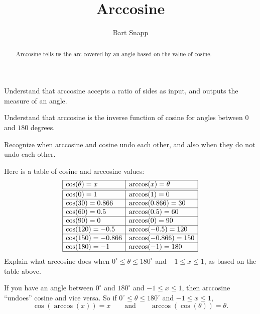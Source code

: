 \documentclass[noauthor,nooutcomes,handout,hints]{ximera}
\title{Arccosine} \author{Bart Snapp}
\begin{document}
\begin{abstract}
  Arccosine tells us the arc covered by an angle based on the value of
  cosine.
\end{abstract}
\maketitle

\begin{listOutcomes}
\item Understand that arccosine accepts a ratio of sides as input, and
  outputs the measure of an angle.
\item Understand that arccosine is the inverse function of cosine for
  angles between $0$ and $180$ degrees.
\item Recognize when arccosine and cosine undo each other, and also
  when they do not undo each other.
\end{listOutcomes}
\mynewpage




\begin{question}
  Here is a table of cosine and arccosine values:
  \[
  \begin{array}{|l|l|} \hline
    \cos(\theta)  = x     & \arccos(x) = \theta \\ \hline\hline
    \cos(0)  = 1     & \arccos(1) = 0 \\ \hline
    \cos(30) = 0.866 & \arccos(0.866) = 30\\ \hline
    \cos(60) = 0.5 & \arccos(0.5) = 60\\ \hline
    \cos(90) = 0 & \arccos(0) = 90\\ \hline
    \cos(120) = -0.5 & \arccos(-0.5) = 120\\ \hline
    \cos(150) = -0.866 & \arccos(-0.866) = 150\\ \hline
    \cos(180) =-1 & \arccos(-1) = 180  \\\hline
  \end{array}
  \]
  Explain what arccosine does when $0^\circ \le \theta \le 180^\circ$
  and $-1\le x\le 1$, as based on the table above.
  \begin{freeResponse}
    If you have an angle between $0^\circ$ and $180^\circ$ and $-1\le
    x\le 1$, then arccosine ``undoes'' cosine and vice versa. So if
    $0^\circ \le \theta \le 180^\circ$ and $-1\le x\le 1$,
    \[
    \cos(\arccos(x)) = x\qquad\text{and}\qquad \arccos(\cos(\theta)) =
    \theta.
    \]
  \end{freeResponse}
\end{question}
\mynewpage
\end{document}
